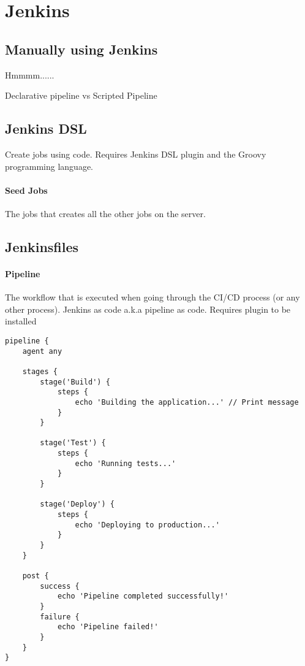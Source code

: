 \documentclass[a4paper, 11pt]{book}
\begin{document}
    \section{Jenkins}
    \subsection{Manually using Jenkins}
    Hmmmm......

    Declarative pipeline vs Scripted Pipeline

    \subsection{Jenkins DSL}
    Create jobs using code.
    Requires Jenkins DSL plugin and the Groovy programming language.
    \paragraph{Seed Jobs}
    The jobs that creates all the other jobs on the server.

    \subsection{Jenkinsfiles}
    \paragraph{Pipeline}
    The workflow that is executed when going through the CI/CD process (or any other process).
    Jenkins as code a.k.a pipeline as code. Requires plugin to be installed

\begin{lstlisting}[caption=Jenkinsfile for a CI/CD Pipeline]
pipeline {
    agent any

    stages {
        stage('Build') {
            steps {
                echo 'Building the application...' // Print message
            }
        }

        stage('Test') {
            steps {
                echo 'Running tests...'
            }
        }

        stage('Deploy') {
            steps {
                echo 'Deploying to production...'
            }
        }
    }

    post {
        success {
            echo 'Pipeline completed successfully!'
        }
        failure {
            echo 'Pipeline failed!'
        }
    }
}
\end{lstlisting}
\end{document}
